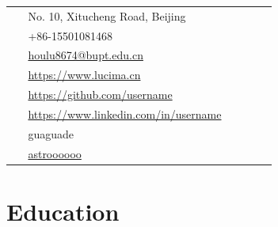 \documentclass[10pt]{article} %
\begin{document}
\begin{paracol}{2}
\parbox[top][0.12\textheight][c]{\linewidth}{ %
	\vspace{-0.04\textheight} %
	\colorbox{shade}{ %
		\begin{supertabular}{p{0.05\linewidth}|p{0.775\linewidth}} %
			\raisebox{-1pt}{\faHome} & No. 10, Xitucheng Road, Beijing \\ %
			\raisebox{-1pt}{\faPhone} & +86-15501081468 \\ %
			\raisebox{0pt}{\small\faEnvelope} & \href{mailto:houlu8674@bupt.edu.cn}{houlu8674@bupt.edu.cn} \\ %
			\raisebox{-1pt}{\small\faDesktop} & \href{https://www.lucima.cn}{https://www.lucima.cn} \\ %
			\raisebox{-1pt}{\faGithub} & \href{https://github.com/username}{https://github.com/username} \\ %
			\raisebox{-1pt}{\faLinkedinSquare} & \href{https://www.linkedin.com/in/username}{https://www.linkedin.com/in/username} \\ %
			\raisebox{-1pt}{\faWechat} &
			guaguade\\
			\raisebox{-1pt}{\faWeibo} &
			\href{http://weibo.com/lucima}{astroooooo}\\
		\end{supertabular}
	}
}


\section{Education} 





\end{paracol}
\end{document}
